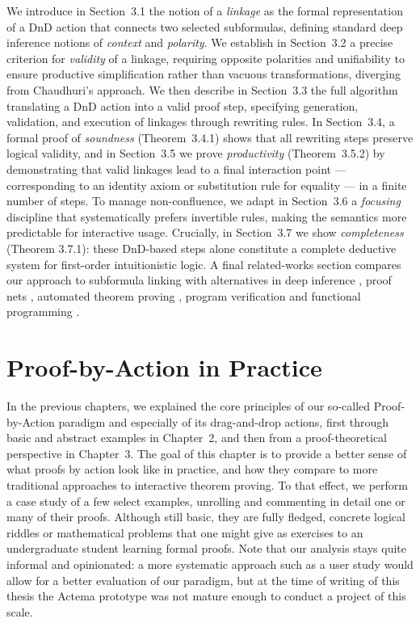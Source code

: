 \documentclass[11pt]{article}
\begin{document}
We introduce in Section~3.1 the notion of a \emph{linkage} as the formal representation of a DnD action that connects two selected subformulas, defining standard deep inference notions of \emph{context} and \emph{polarity}. We establish in Section~3.2 a precise criterion for \emph{validity} of a linkage, requiring opposite polarities and unifiability to ensure productive simplification rather than vacuous transformations, diverging from Chaudhuri's approach. We then describe in Section~3.3 the full algorithm translating a DnD action into a valid proof step, specifying generation, validation, and execution of linkages through rewriting rules. In Section~3.4, a formal proof of \emph{soundness} (Theorem~3.4.1) shows that all rewriting steps preserve logical validity, and in Section~3.5 we prove \emph{productivity} (Theorem~3.5.2) by demonstrating that valid linkages lead to a final interaction point --- corresponding to an identity axiom or substitution rule for equality --- in a finite number of steps. To manage non-confluence, we adapt in Section~3.6 a \emph{focusing} discipline \cite{andreoli1992} that systematically prefers invertible rules, making the semantics more predictable for interactive usage. Crucially, in Section~3.7 we show \emph{completeness} (Theorem 3.7.1): these DnD-based steps alone constitute a complete deductive system for first-order intuitionistic logic. A final related-works section compares our approach to subformula linking with alternatives in deep inference \cite{DBLP:conf/cade/Chaudhuri21}, proof nets \cite{girard-linear-1987,strasburger-problem-2019,hughes2019firstorder}, automated theorem proving \cite{1674698}, program verification \cite{mulder_unification_2024} and functional programming \cite{elliott-tangible}.

\section{Proof-by-Action in Practice}

In the previous chapters, we explained the core principles of our so-called
Proof-by-Action paradigm and especially of its drag-and-drop actions, first
through basic and abstract examples in Chapter~2, and then from a
proof-theoretical perspective in Chapter~3. The goal of this chapter is
to provide a better sense of what proofs by action look like in
practice, and how they compare to more traditional approaches to interactive
theorem proving. To that effect, we perform a case study of a few select
examples, unrolling and commenting in detail one or many of their proofs.
Although still basic, they are fully fledged, concrete logical riddles or
mathematical problems that one might give as exercises to an undergraduate
student learning formal proofs. Note that our analysis stays quite informal
and opinionated: a more systematic approach such as a user study would allow for
a better evaluation of our paradigm, but at the time of writing of this thesis
the Actema prototype was not mature enough to conduct a project of this
scale.
\end{document}
